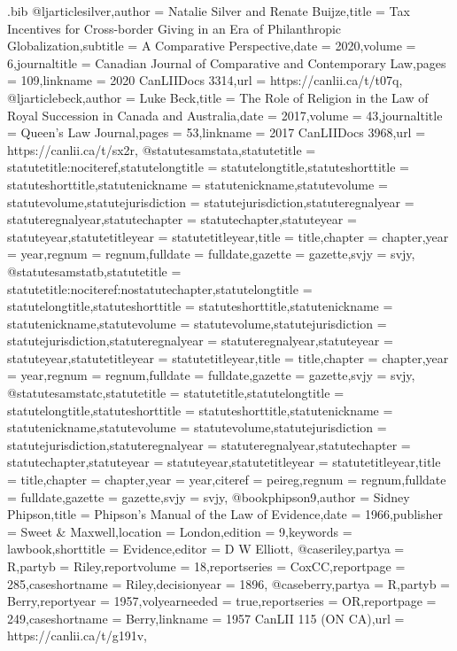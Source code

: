 \begin{filecontents*}[overwrite]{\jobname.bib}
@ljarticle{silver,author = {Natalie Silver and Renate Buijze},title = {Tax Incentives for Cross-border Giving in an Era of Philanthropic Globalization},subtitle = {A Comparative Perspective},date = {2020},volume = {6},journaltitle = {Canadian Journal of Comparative and Contemporary Law},pages = {109},linkname = {2020 CanLIIDocs 3314},url = {https://canlii.ca/t/t07q},}
@ljarticle{beck,author = {Luke Beck},title = {The Role of Religion in the Law of Royal Succession in Canada and Australia},date = {2017},volume = {43},journaltitle = {Queen's Law Journal},pages = {53},linkname = {2017 CanLIIDocs 3968},url = {https://canlii.ca/t/sx2r},}
@statute{samstata,statutetitle = {statutetitle:nociteref},statutelongtitle = {statutelongtitle},statuteshorttitle = {statuteshorttitle},statutenickname = {statutenickname},statutevolume = {statutevolume},statutejurisdiction = {statutejurisdiction},statuteregnalyear = {statuteregnalyear},statutechapter = {statutechapter},statuteyear = {statuteyear},statutetitleyear = {statutetitleyear},title = {title},chapter = {chapter},year = {year},regnum = {regnum},fulldate = {fulldate},gazette = {gazette},svjy = {svjy},}
@statute{samstatb,statutetitle = {statutetitle:nociteref:nostatutechapter},statutelongtitle = {statutelongtitle},statuteshorttitle = {statuteshorttitle},statutenickname = {statutenickname},statutevolume = {statutevolume},statutejurisdiction = {statutejurisdiction},statuteregnalyear = {statuteregnalyear},statuteyear = {statuteyear},statutetitleyear = {statutetitleyear},title = {title},chapter = {chapter},year = {year},regnum = {regnum},fulldate = {fulldate},gazette = {gazette},svjy = {svjy},}
@statute{samstatc,statutetitle = {statutetitle},statutelongtitle = {statutelongtitle},statuteshorttitle = {statuteshorttitle},statutenickname = {statutenickname},statutevolume = {statutevolume},statutejurisdiction = {statutejurisdiction},statuteregnalyear = {statuteregnalyear},statutechapter = {statutechapter},statuteyear = {statuteyear},statutetitleyear = {statutetitleyear},title = {title},chapter = {chapter},year = {year},citeref = {peireg},regnum = {regnum},fulldate = {fulldate},gazette = {gazette},svjy = {svjy},}
@book{phipson9,author = {Sidney Phipson},title = {Phipson’s Manual of the Law of Evidence},date = {1966},publisher = {Sweet \& Maxwell},location = {London},edition = {9},keywords = {lawbook},shorttitle = {Evidence},editor = {D W Elliott},}
@case{riley,partya = {R},partyb = {Riley},reportvolume = {18},reportseries = {CoxCC},reportpage = {285},caseshortname = {Riley},decisionyear = {1896},}
@case{berry,partya = {R},partyb = {Berry},reportyear = {1957},volyearneeded = {true},reportseries = {OR},reportpage = {249},caseshortname = {Berry},linkname = {1957 CanLII 115 (ON CA)},url = {https://canlii.ca/t/g191v},}

\end{filecontents*}
